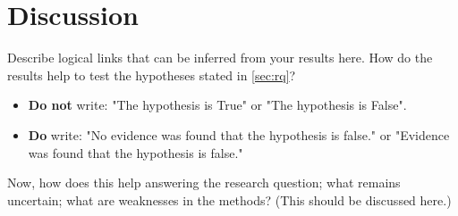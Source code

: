 \chapter{Discussion}
\label{ch:discussion}

Describe logical links that can be inferred from your results here. How do the results help to test the hypotheses stated in \autoref{sec:rq}?\vspace{1em}

\begin{itemize}
	\item \textbf{Do not} write: "The hypothesis is True" or "The hypothesis is False".
	\item \textbf{Do} write: "No evidence was found that the hypothesis is false." or "Evidence was found that the hypothesis is false."
\end{itemize}
\vspace{1em}
Now, how does this help answering the research question; what remains uncertain; what are weaknesses in the methods? (This should be discussed here.)
\vspace{1em}



